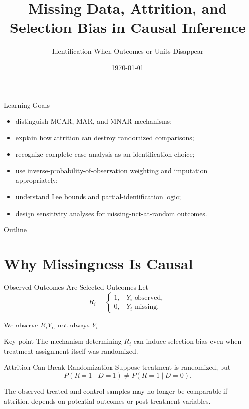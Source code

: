 \documentclass[aspectratio=169,11pt]{beamer}
\title[Missing Data and Selection Bias]{Missing Data, Attrition, and Selection Bias in Causal Inference}
\subtitle{Identification When Outcomes or Units Disappear}
\date{\today}
\begin{document}
\begin{frame}
\titlepage
\end{frame}

\begin{frame}{Learning Goals}
\begin{itemize}
\item distinguish MCAR, MAR, and MNAR mechanisms;
\item explain how attrition can destroy randomized comparisons;
\item recognize complete-case analysis as an identification choice;
\item use inverse-probability-of-observation weighting and imputation appropriately;
\item understand Lee bounds and partial-identification logic;
\item design sensitivity analyses for missing-not-at-random outcomes.
\end{itemize}
\end{frame}

\begin{frame}{Outline}
\tableofcontents
\end{frame}

\section{Why Missingness Is Causal}

\begin{frame}{Observed Outcomes Are Selected Outcomes}
Let
\[
R_i=
\begin{cases}
1,&Y_i\text{ observed},\\
0,&Y_i\text{ missing}.
\end{cases}
\]

We observe \(R_iY_i\), not always \(Y_i\).

\begin{alertblock}{Key point}
The mechanism determining \(R_i\) can induce selection bias even when treatment assignment itself was randomized.
\end{alertblock}
\end{frame}

\begin{frame}{Attrition Can Break Randomization}
Suppose treatment is randomized, but
\[
P(R=1\mid D=1) \neq P(R=1\mid D=0).
\]

The observed treated and control samples may no longer be comparable if attrition depends on potential outcomes or post-treatment variables.
\end{frame}
\end{document}
